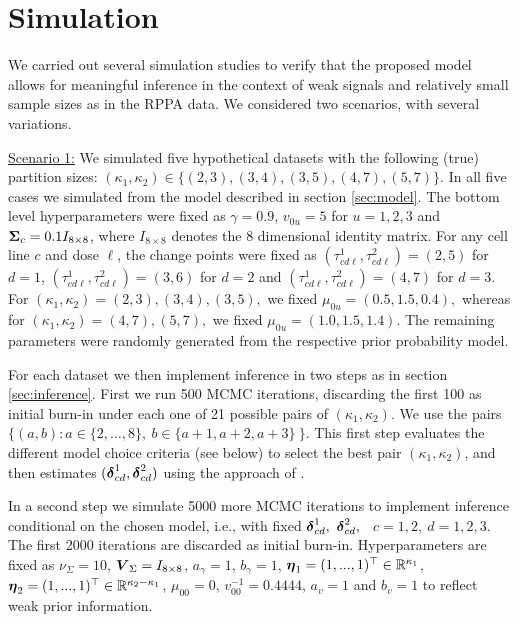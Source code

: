 \section{Simulation}
\label{sec:simulation}

We carried out several simulation studies to verify that the proposed
model allows for meaningful inference in the context of weak signals
and relatively small sample sizes as in the RPPA data.  We considered
two scenarios, with several variations.
\smallskip

\underline{Scenario 1:}
We simulated five hypothetical datasets with the following
(true) partition sizes: $(\kappa_1, \kappa_2) \in \{ (2,3), (3,4), (3, 5), (4,7),
(5,7)\}$. In all five cases we simulated from the model described in
section \ref{sec:model}. The bottom level hyperparameters were fixed as
$\gamma = 0.9$, $v_{0u} = 5$ for $u = 1, 2, 3$ and $\mbox{\boldmath $\Sigma$}_c = 0.1 I_{8\times 8}$, where $I_{8\times 8}$ denotes the 8 dimensional identity matrix.
For any cell line $c$ and dose $\ell$, the change points were fixed as
$(\tau^1_{cd\ell}, \tau^2_{cd\ell}) = (2, 5)$ for $d = 1$, $(\tau^1_{cd\ell}, \tau^2_{cd\ell}) = (3, 6)$
for $d=2$ and $(\tau^1_{cd\ell}, \tau^2_{cd\ell}) = (4,7)$ for $d=3$. For
$(\kappa_1, \kappa_2) = (2,3), (3,4), (3, 5),$ we fixed $\mu_{0u} = (0.5,
1.5, 0.4),$ whereas for $(\kappa_1, \kappa_2) = (4,7), (5,7),$ we fixed
$\mu_{0u} = (1.0, 1.5, 1.4).$ The remaining parameters were randomly
generated from the respective prior probability model. 

For each dataset we then implement inference in two steps as in section
\ref{sec:inference}. First we run 500 MCMC iterations,
discarding the first 100 as initial burn-in
under each one of 21 possible pairs of $(\kappa_1,\kappa_2)$. We use the pairs
$\{(a,b): a \in \{2,\ldots, 8\}, \ b \in \{a+1, a+2, a+3\} \ \}$.
This first step evaluates the different model choice
criteria (see below) to select the best pair $(\kappa_1, \kappa_2)$,
and then estimates $(\mbox{\boldmath $\delta$}^1_{cd},\mbox{\boldmath $\delta$}^2_{cd})$ using the approach of
\cite{dahl2006}.

In a second step we simulate 5000 more MCMC iterations
to implement inference conditional on the
chosen model, i.e., with fixed
$\mbox{\boldmath $\delta$}^1_{cd}, \ \mbox{\boldmath $\delta$}^2_{cd},$ \  $c=1,2, \ d = 1,2,3$.
The first 2000 iterations are discarded as initial burn-in.
Hyperparameters are fixed
as $\nu_{\Sigma} = 10$, $\mbox{\boldmath $V$}_{\Sigma}=I_{8\times 8}$,
$a_{\gamma}= 1$, $b_{\gamma}= 1$, $\mbox{\boldmath $\eta$}_1= (1,...,1)^{\top} \in
\mathbb{R}^{\kappa_1}$, $\mbox{\boldmath $\eta$}_2=(1,...,1)^{\top} \in
\mathbb{R}^{\kappa_2 - \kappa_1}$, $\mu_{00}=0$, $v^{-1}_{00}=0.4444$,
$a_v=1$ and $b_v=1$ to reflect weak prior information.

